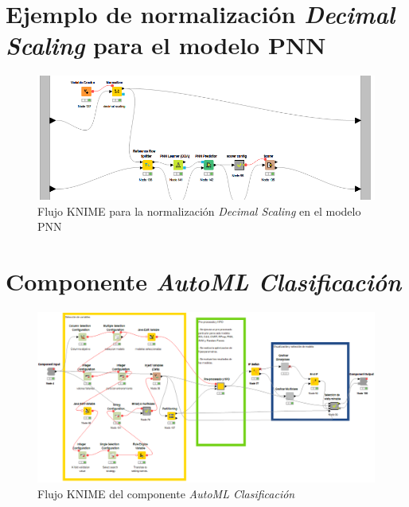 \chapter{Ejemplo de normalización \textit{Decimal Scaling} para el modelo PNN}

\begin{figure}[H]
	\centering
	\includegraphics[width=\textwidth]{"figuras/anexos/ejemplo normalizacion pnn decimal scaling"}
	\caption{Flujo KNIME para la normalización \textit{Decimal Scaling} en el modelo PNN}
	\label{anex:ejemplo-normalizacion-pnn-decimal-scaling}
\end{figure}

\chapter{Componente \textit{AutoML Clasificación}} \label{aped:13}

\begin{figure}[H]
	\centering
	\includegraphics[width=\textwidth]{"figuras/anexos/componente integrado"}
	\caption{Flujo KNIME del componente \textit{AutoML Clasificación}}
	\label{anex:componente-integrado}
\end{figure}


